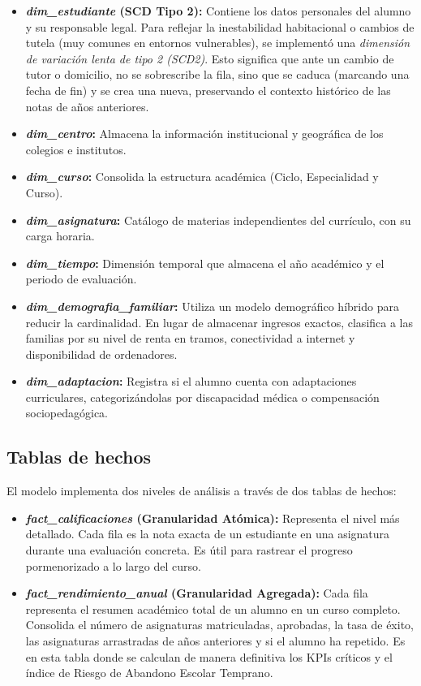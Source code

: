 \begin{itemize}
    \item \textbf{\textit{dim\_estudiante} (SCD Tipo 2):} Contiene los datos personales del alumno y su responsable legal. Para reflejar la inestabilidad habitacional o cambios de tutela (muy comunes en entornos vulnerables), se implementó una \textit{dimensión de variación lenta de tipo 2 (SCD2)}. Esto significa que ante un cambio de tutor o domicilio, no se sobrescribe la fila, sino que se caduca (marcando una fecha de fin) y se crea una nueva, preservando el contexto histórico de las notas de años anteriores.
    \item \textbf{\textit{dim\_centro}:} Almacena la información institucional y geográfica de los colegios e institutos.
    \item \textbf{\textit{dim\_curso}:} Consolida la estructura académica (Ciclo, Especialidad y Curso).
    \item \textbf{\textit{dim\_asignatura}:} Catálogo de materias independientes del currículo, con su carga horaria.
    \item \textbf{\textit{dim\_tiempo}:} Dimensión temporal que almacena el año académico y el periodo de evaluación.
    \item \textbf{\textit{dim\_demografia\_familiar}:} Utiliza un modelo demográfico híbrido para reducir la cardinalidad. En lugar de almacenar ingresos exactos, clasifica a las familias por su nivel de renta en tramos, conectividad a internet y disponibilidad de ordenadores.
    \item \textbf{\textit{dim\_adaptacion}:} Registra si el alumno cuenta con adaptaciones curriculares, categorizándolas por discapacidad médica o compensación sociopedagógica.
\end{itemize}

\subsection{Tablas de hechos}

El modelo implementa dos niveles de análisis a través de dos tablas de hechos:

\begin{itemize}
    \item \textbf{\textit{fact\_calificaciones} (Granularidad Atómica):} Representa el nivel más detallado. Cada fila es la nota exacta de un estudiante en una asignatura durante una evaluación concreta. Es útil para rastrear el progreso pormenorizado a lo largo del curso.
    \item \textbf{\textit{fact\_rendimiento\_anual} (Granularidad Agregada):} Cada fila representa el resumen académico total de un alumno en un curso completo. Consolida el número de asignaturas matriculadas, aprobadas, la tasa de éxito, las asignaturas arrastradas de años anteriores y si el alumno ha repetido. Es en esta tabla donde se calculan de manera definitiva los KPIs críticos y el índice de Riesgo de Abandono Escolar Temprano.
\end{itemize}

